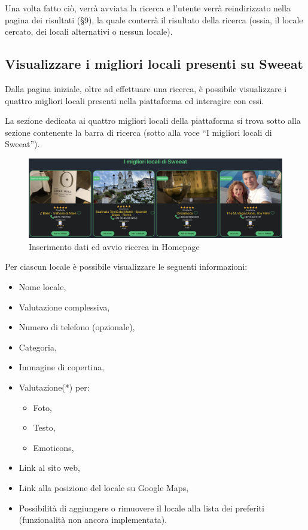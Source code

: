 Una volta fatto ciò, verrà avviata la ricerca e l’utente verrà reindirizzato nella pagina dei risultati (\S{9}), la quale conterrà il risultato della ricerca (ossia, il locale cercato, dei locali alternativi o nessun locale).

\subsection{Visualizzare i migliori locali presenti su Sweeat}

Dalla pagina iniziale, oltre ad effettuare una ricerca, è possibile visualizzare i quattro migliori locali presenti nella piattaforma ed interagire con essi.

La sezione dedicata ai quattro migliori locali della piattaforma si trova sotto alla sezione contenente la barra di ricerca (sotto alla voce “I migliori locali di Sweeat”).

\begin{figure}[H]
\centering
\includegraphics[scale=0.3]{./images/Homepage/MiglioriLocali.png} 
\caption{Inserimento dati ed avvio ricerca in Homepage}
\end{figure}

Per ciascun locale è possibile visualizzare le seguenti informazioni:

\begin{itemize}
\item Nome locale,
\item Valutazione complessiva,
\item Numero di telefono (opzionale),
\item Categoria,
\item Immagine di copertina,
\item Valutazione(*) per:
\begin{itemize}
\item Foto,
\item Testo,
\item Emoticons,
\end{itemize}
\item Link al sito web,
\item Link alla posizione del locale su Google Maps,
\item Possibilità di aggiungere o rimuovere il locale alla lista dei preferiti (funzionalità non ancora implementata).
\end{itemize}

